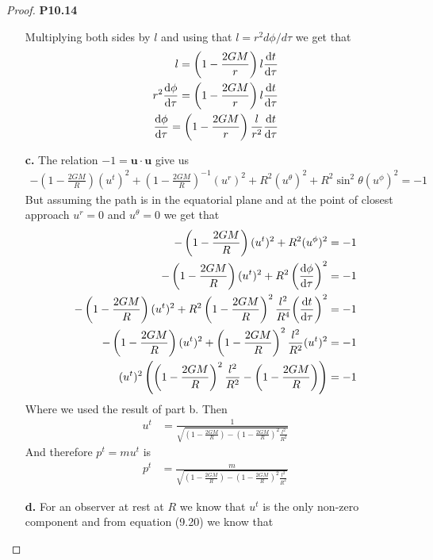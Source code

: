 \documentclass[11pt]{article}
\theoremstyle{definition}
\begin{document}
\begin{proof}{\textbf{P10.14}}
\begin{itemize}
    Multiplying both sides by $l$ and using that $l = r^2d\phi/d\tau$ we get
    that
    \begin{align*}
        l = \left(1 - \frac{2GM}{r}\right)l\dv{t}{\tau}\\
        r^2\dv{\phi}{\tau} = \left(1 - \frac{2GM}{r}\right)l\dv{t}{\tau}\\
        \dv{\phi}{\tau} = \left(1 - \frac{2GM}{r}\right)\frac{l}{r^2}\dv{t}{\tau}
    \end{align*}
\cleardoublepage
    \item [\textbf{c.}] The relation $-1 = \bm{u} \cdot \bm{u}$ give us 
    \begin{align*}
        -\left(1 - \frac{2GM}{R}\right) (u^t)^2
        + \left(1 - \frac{2GM}{R}\right)^{-1} (u^r)^2 + R^2 (u^\theta)^2
        + R^2 \sin^2\theta(u^\phi)^2 = -1
    \end{align*}
    But assuming the path is in the equatorial plane and at the point of
    closest approach $u^r = 0$ and $u^\theta = 0$ we get that
    \begin{align*}
        -\left(1 - \frac{2GM}{R}\right) (u^t)^2 + R^2 (u^\phi)^2 &= -1\\
        -\left(1 - \frac{2GM}{R}\right) (u^t)^2
        + R^2 \left(\dv{\phi}{\tau}\right)^2 &= -1\\
        -\left(1 - \frac{2GM}{R}\right) (u^t)^2
        + R^2 \left(1 - \frac{2GM}{R}\right)^2\frac{l^2}{R^4}
        \bigg(\dv{t}{\tau}\bigg)^2 &= -1\\
        -\left(1 - \frac{2GM}{R}\right) (u^t)^2
        + \left(1 - \frac{2GM}{R}\right)^2\frac{l^2}{R^2} (u^t)^2 &= -1\\
        (u^t)^2\left(\left(1 - \frac{2GM}{R}\right)^2\frac{l^2}{R^2}
        - \left(1 - \frac{2GM}{R}\right) \right) &= -1
    \end{align*}
    Where we used the result of part b. Then
    \begin{align*}
        u^t &= \frac{1}{\sqrt{\left(1 - \frac{2GM}{R}\right)
        - \left(1 - \frac{2GM}{R}\right)^2\frac{l^2}{R^2}}}
    \end{align*}
    And therefore $p^t = mu^t$ is
    \begin{align*}
        p^t &= \frac{m}{\sqrt{\left(1 - \frac{2GM}{R}\right)
        - \left(1 - \frac{2GM}{R}\right)^2\frac{l^2}{R^2}}}
    \end{align*}
    \item [\textbf{d.}] For an observer at rest at $R$ we know that $u^t$ is
    the only non-zero component and from equation (9.20) we know that

\end{itemize}
\end{proof}
\end{document}
